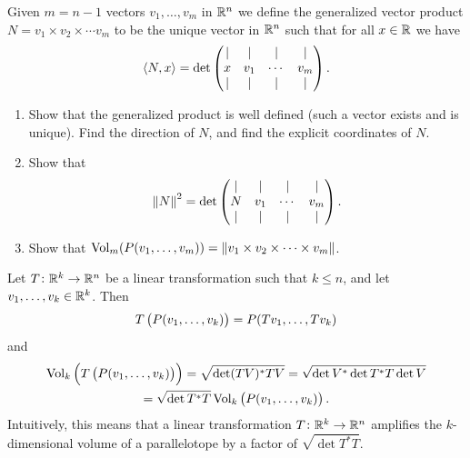 \documentclass[11pt,a4paper]{article}
\begin{document}
\begin{exercise}
  Given $m = n - 1$ vectors $v_1,\dots,v_m$ in $\mathbb{R}^n$ we define the
  generalized vector product $N = v_1 \times v_2 \times \cdots v_m$
  to be the unique vector in $\mathbb{R}^n$ such that for all $x \in \mathbb{R}$ we have
  \[
    \left\langle N, x \right\rangle =
    \det
    \begin{pmatrix}
      \vert & \vert & \vert & \vert \\
      x & v_1 & \cdots & v_m \\
      \vert & \vert & \vert & \vert \\
    \end{pmatrix}.
  \]
  \begin{enumerate}
    \item[(1)] Show that the generalized product is well defined
      (such a vector exists and is unique).
      Find the direction of $N$, and find the explicit coordinates of $N$.
    \item[(2)] Show that
      \[
        \left\lVert N\right\rVert^2 =
        \det 
        \begin{pmatrix}
          \vert & \vert & \vert & \vert \\
          N & v_1 & \cdots & v_m \\
          \vert & \vert & \vert & \vert \\
        \end{pmatrix}.
      \]
    \item[(3)] Show that $\operatorname{Vol}_{m}(P(v_1,\dots,v_m)) =
      \left\lVert v_1 \times v_2 \times \cdots \times v_m\right\rVert$.
  \end{enumerate}
\end{exercise}

\begin{remark}
  Let $T \colon \mathbb{R}^k \to \mathbb{R}^n$ be a linear transformation such that
  $k \le n$,
  and let $v_1,\dots,v_k \in \mathbb{R}^k$.
  Then
  \[
    T\del{P(v_1,\dots,v_k)} = P(Tv_1,\dots,Tv_k)
  \]
  and
  \begin{multline*}
    \Vol_k\del{T\del{P(v_1,\dots,v_k)}} =
    \sqrt{\det (T V)^* T V} =
    \sqrt{\det V^* \det T^* T \det V} \\ =
    \sqrt{\det T^* T} \Vol_k\del{P(v_1,\dots,v_k)}.
  \end{multline*}
  Intuitively, this means that a linear
  transformation $T \colon \mathbb{R}^k \to \mathbb{R}^n$
  amplifies the $k$-dimensional volume of a parallelotope by a factor
  of $\sqrt{\det T^* T}$.
\end{remark}
\end{document}
